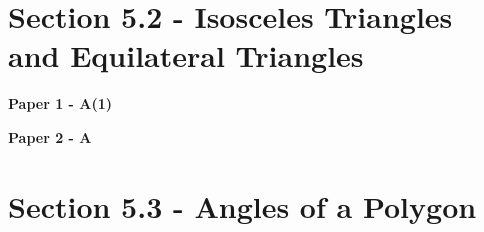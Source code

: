 \documentclass[12pt, a4paper]{article}
\begin{document}
\section*{Section 5.2 - Isosceles Triangles and Equilateral Triangles}\label{section:2-5-2}

\textbf{Paper 1 - A(1)}
\begin{enumx}[label=\arabic*.,start=1]
\item {}\label{DSE2016-CoreP1-Q07} 
\end{enumx}
\textbf{Paper 2 - A}
\begin{enumx}[label=\arabic*.,start=2]
\item {}\label{DSE2012P-CoreP2-Q19} 
\item {}\label{DSE2017-CoreP2-Q17} 
\item {}\label{DSE2017-CoreP2-Q18} 
\item {}\label{DSE2019-CoreP2-Q17} 
\item {}\label{DSE2020-CoreP2-Q20} 
\item {}\label{DSE2021-CoreP2-Q18} 
\item {}\label{DSE2022-CoreP2-Q19} 
\end{enumx}




\section*{Section 5.3 - Angles of a Polygon}\label{section:2-5-3}
\end{document}
